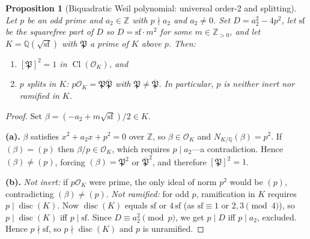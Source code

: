 \documentclass[11pt,a4paper]{article}
\newtheorem{proposition}[theorem]{Proposition}
\theoremstyle{definition}
\newcommand{\ZZ}{\mathbb{Z}}
\newcommand{\QQ}{\mathbb{Q}}
\newcommand{\Cl}{\operatorname{Cl}}
\newcommand{\disc}{\operatorname{disc}}
\begin{document}
\begin{proposition}[Biquadratic Weil polynomial: universal order-2 and splitting]
\label{prop:biquad-order2}
Let $p$ be an odd prime and $a_2 \in \ZZ$ with $p \nmid a_2$ and $a_2 \neq 0$.
Set $D = a_2^2 - 4p^2$, let $\mathrm{sf}$ be the squarefree part of $D$ so
$D = \mathrm{sf} \cdot m^2$ for some $m \in \ZZ_{>0}$, and let $K = \QQ(\sqrt{\mathrm{sf}})$
with $\mathfrak{P}$ a prime of $K$ above $p$.  Then:
\begin{enumerate}[label=(\alph*)]
  \item $[\mathfrak{P}]^2 = 1$ in $\Cl(\mathcal{O}_K)$, and
  \item $p$ \emph{splits} in $K$\textup{:} $p\mathcal{O}_K = \mathfrak{P}\overline{\mathfrak{P}}$
        with $\mathfrak{P} \neq \overline{\mathfrak{P}}$.  In particular, $p$ is neither
        inert nor ramified in $K$.
\end{enumerate}
\end{proposition}

\begin{proof}
Set $\beta = (-a_2 + m\sqrt{\mathrm{sf}})/2 \in K$.

\textbf{(a).}
$\beta$ satisfies $x^2 + a_2 x + p^2 = 0$ over $\ZZ$, so $\beta \in \mathcal{O}_K$ and
$N_{K/\QQ}(\beta) = p^2$.  If $(\beta) = (p)$ then $\beta/p \in \mathcal{O}_K$, which requires
$p \mid a_2$---a contradiction.  Hence $(\beta) \neq (p)$, forcing $(\beta) = \mathfrak{P}^2$
or $\overline{\mathfrak{P}}^2$, and therefore $[\mathfrak{P}]^2 = 1$.

\textbf{(b).}
\emph{Not inert:} if $p\mathcal{O}_K$ were prime, the only ideal of norm $p^2$ would be $(p)$,
contradicting $(\beta) \neq (p)$.
\emph{Not ramified:} for odd $p$, ramification in $K$ requires $p \mid \disc(K)$.
Now $\disc(K)$ equals $\mathrm{sf}$ or $4\,\mathrm{sf}$ (as $\mathrm{sf} \equiv 1$ or
$2,3 \pmod{4}$), so $p \mid \disc(K)$ iff $p \mid \mathrm{sf}$.  Since
$D \equiv a_2^2 \pmod{p}$, we get $p \mid D$ iff $p \mid a_2$, excluded.
Hence $p \nmid \mathrm{sf}$, so $p \nmid \disc(K)$ and $p$ is unramified.
\end{proof}
\end{document}
